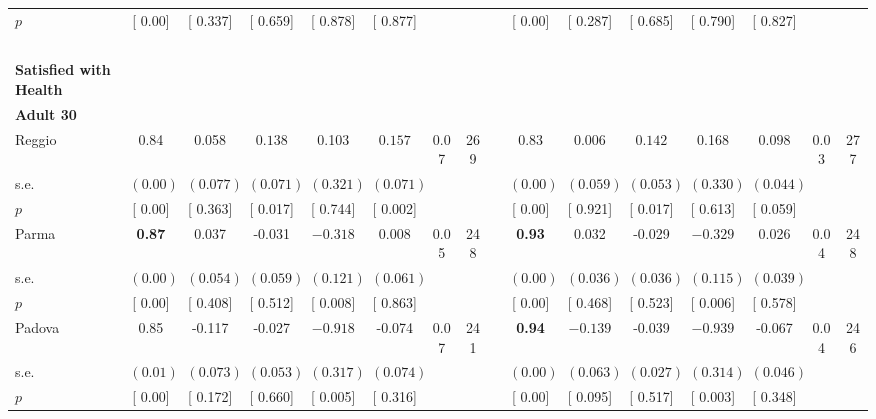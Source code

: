 \begin{longtable}{L{8em} c c c c c c c p{1em} c c c c c c c}
\quad \quad \quad \quad $ p$ & [     0.00] & [    0.337] & [    0.659] & [    0.878] & [    0.877] & & & & [     0.00] & [    0.287] & [    0.685] & [    0.790] & [    0.827] & &  \\[1em]
~\\[1em]
\textbf{Satisfied with Health} \\*
\quad \quad \textbf{Adult 30} & & & & & & & & & & & & & & & \\* 
\quad \quad \quad Reggio& 0.84 &     0.058 & $ \mathbf{    0.138}$ &     0.103 & $ \mathbf{    0.157}$ &      0.07 &       269 & & 0.83 &     0.006 & $ \mathbf{    0.142}$ &     0.168 & $ \mathbf{    0.098}$ &      0.03 &       277  \\*
\quad \quad \quad \quad s.e.& $ (     0.00)$ & $ (    0.077)$ & $ (    0.071)$ & $ (    0.321)$ & $ (    0.071)$ & & & & $ (     0.00)$ & $ (    0.059)$ & $ (    0.053)$ & $ (    0.330)$ & $ (    0.044)$ & &  \\*
\quad \quad \quad \quad $ p$ & [     0.00] & [    0.363] & [    0.017] & [    0.744] & [    0.002] & & & & [     0.00] & [    0.921] & [    0.017] & [    0.613] & [    0.059] & &  \\[1em]
\quad \quad \quad Parma& \textbf{     0.87} &     0.037 &    -0.031 & $ \mathbf{   -0.318}$ &     0.008 &      0.05 &       248 & & \textbf{     0.93} &     0.032 &    -0.029 & $ \mathbf{   -0.329}$ &     0.026 &      0.04 &       248  \\*
\quad \quad \quad \quad s.e.& $ (     0.00)$ & $ (    0.054)$ & $ (    0.059)$ & $ (    0.121)$ & $ (    0.061)$ & & & & $ (     0.00)$ & $ (    0.036)$ & $ (    0.036)$ & $ (    0.115)$ & $ (    0.039)$ & &  \\*
\quad \quad \quad \quad $ p$ & [     0.00] & [    0.408] & [    0.512] & [    0.008] & [    0.863] & & & & [     0.00] & [    0.468] & [    0.523] & [    0.006] & [    0.578] & &  \\[1em]
\quad \quad \quad Padova& 0.85 &    -0.117 &    -0.027 & $ \mathbf{   -0.918}$ &    -0.074 &      0.07 &       241 & & \textbf{     0.94} & $ \mathbf{   -0.139}$ &    -0.039 & $ \mathbf{   -0.939}$ &    -0.067 &      0.04 &       246  \\*
\quad \quad \quad \quad s.e.& $ (     0.01)$ & $ (    0.073)$ & $ (    0.053)$ & $ (    0.317)$ & $ (    0.074)$ & & & & $ (     0.00)$ & $ (    0.063)$ & $ (    0.027)$ & $ (    0.314)$ & $ (    0.046)$ & &  \\*
\quad \quad \quad \quad $ p$ & [     0.00] & [    0.172] & [    0.660] & [    0.005] & [    0.316] & & & & [     0.00] & [    0.095] & [    0.517] & [    0.003] & [    0.348] & &  \\[1em]

\end{longtable}
